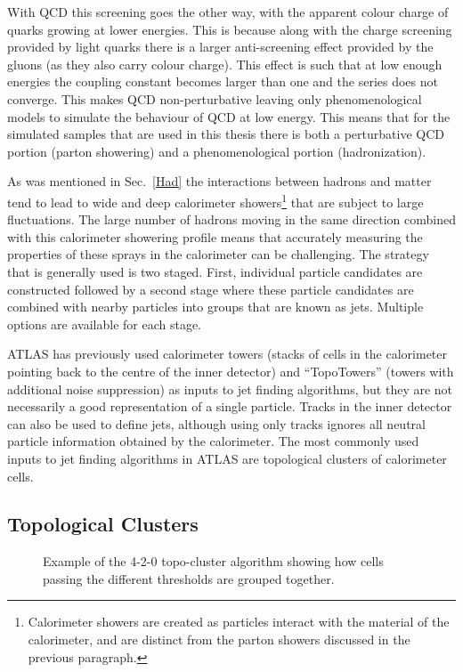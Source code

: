 With QCD this screening goes the other way, with the apparent colour charge of quarks growing at lower energies.  
This is because along with the charge screening provided by light quarks there is a larger anti-screening effect provided by the gluons (as they also carry colour charge).  
This effect is such that at low enough energies the coupling constant becomes larger than one and the series does not converge.  
This makes QCD non-perturbative leaving only phenomenological models to simulate the behaviour of QCD at low energy.  
This means that for the simulated samples that are used in this thesis there is both a perturbative QCD portion (parton showering) and a phenomenological portion (hadronization).  

As was mentioned in Sec.~\ref{Had} the interactions between hadrons and matter tend to lead to wide and deep calorimeter showers\footnote{Calorimeter showers are created as particles interact with the material of the calorimeter, and are distinct from the parton showers discussed in the previous paragraph. } that are subject to large fluctuations.  
The large number of hadrons moving in the same direction combined with this calorimeter showering profile means that accurately measuring the properties of these sprays in the calorimeter can be challenging.  
The strategy that is generally used is two staged.  
First, individual particle candidates are constructed followed by a second stage where these particle candidates are combined with nearby particles into groups that are known as jets.  
Multiple options are available for each stage.  

ATLAS has previously used calorimeter towers (stacks of cells in the calorimeter pointing back to the centre of the inner detector) and ``TopoTowers'' (towers with additional noise suppression) as inputs to jet finding algorithms, but they are not necessarily a good representation of a single particle.  
Tracks in the inner detector can also be used to define jets, although using only tracks ignores all neutral particle information obtained by the calorimeter.  
The most commonly used inputs to jet finding algorithms in ATLAS are topological clusters of calorimeter cells.  
 
\subsection{Topological Clusters}
\label{Sec:Topocluster}
\begin{figure}[!ht]
  \begin{center}
  \end{center}
  \caption[Topoclustering diagram]
  {\small Example of the 4-2-0 topo-cluster algorithm showing how cells passing the different thresholds are grouped together.  }
\end{figure}

